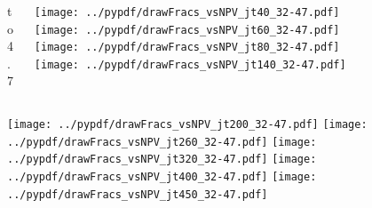 \documentclass[aspectratio=169]{beamer}
\begin{document}
\begin{figure}[p]
\flushleft
\begin{columns}[T]
\begin{column}{.2\linewidth}
 to 4.7
\end{column}
\begin{column}{.8\linewidth}
\texttt{[image: ../pypdf/drawFracs\_vsNPV\_jt40\_32-47.pdf]}
\texttt{[image: ../pypdf/drawFracs\_vsNPV\_jt60\_32-47.pdf]}
\texttt{[image: ../pypdf/drawFracs\_vsNPV\_jt80\_32-47.pdf]}
\texttt{[image: ../pypdf/drawFracs\_vsNPV\_jt140\_32-47.pdf]}
\end{column}
\end{columns}
\texttt{[image: ../pypdf/drawFracs\_vsNPV\_jt200\_32-47.pdf]}
\texttt{[image: ../pypdf/drawFracs\_vsNPV\_jt260\_32-47.pdf]}
\texttt{[image: ../pypdf/drawFracs\_vsNPV\_jt320\_32-47.pdf]}
\texttt{[image: ../pypdf/drawFracs\_vsNPV\_jt400\_32-47.pdf]}
\texttt{[image: ../pypdf/drawFracs\_vsNPV\_jt450\_32-47.pdf]}
\end{figure}
\end{document}
